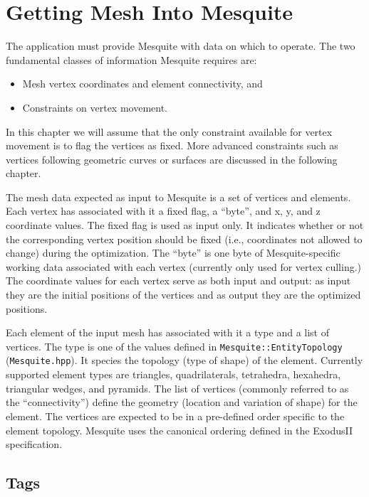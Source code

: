\chapter{Getting Mesh Into Mesquite}
\label{sec:meshes}

The application must provide Mesquite with data on which to operate.  The two
fundamental classes of information Mesquite requires are:
\begin{itemize}
\item Mesh vertex coordinates and element connectivity, and
\item Constraints on vertex movement.
\end{itemize}
In this chapter we will assume that the only constraint available for vertex movement is to flag the vertices as fixed.  More advanced constraints such as vertices following geometric curves or surfaces are discussed in the following chapter.  

The mesh data expected as input to Mesquite is a set of vertices and elements.  Each vertex has associated with it a fixed flag, a ``byte'', and x, y, and z coordinate values.  The fixed flag is used as input only.  It indicates whether or not the corresponding vertex position should be fixed (i.e., coordinates not allowed to change) during the optimization.  The ``byte'' is one byte of Mesquite-specific working data associated with each vertex (currently only used for vertex culling.)   The coordinate values for each vertex serve as both input and output: as input they are the initial positions of the vertices and as output they are the optimized positions.  

Each element of the input mesh has associated with it a type and a list of vertices.  The type is one of the values defined in \texttt{Mesquite::EntityTopology} (\texttt{Mesquite.hpp}).  It species the topology (type of shape) of the element. Currently supported element types are triangles, quadrilaterals, 
tetrahedra, hexahedra, triangular wedges, and pyramids.  The list of vertices (commonly referred to as the ``connectivity'') define the geometry (location and variation of shape) for the element.  The vertices are expected to be in a pre-defined order specific to the element topology. Mesquite uses the canonical ordering defined in the ExodusII specification\cite{exodus}.

\section{Tags} \label{sec:tags_section}

